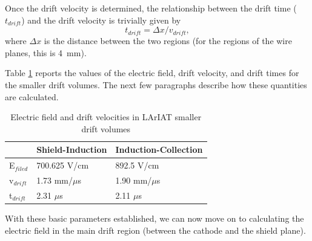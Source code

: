 Once the drift velocity is determined, the relationship between the drift time ($t_{drift}$) and the drift velocity is trivially given by
\begin{equation}
t_{drift} = \Delta x/v_{drift}, \label{eq:drifttime}
\end{equation}
where $\Delta x$ is the distance between the two regions (for the regions of the wire planes, this is 4~mm).

Table \ref{tab:Efields} reports the values of the electric field, drift velocity, and drift times for the smaller drift volumes. The next few paragraphs describe how these quantities are calculated.

 
\begin{table}[]
\centering
\caption{Electric field and drift velocities in LArIAT smaller drift volumes}
\label{tab:Efields}
\begin{tabular}{|l|l|l|}
\hline
& Shield-Induction & Induction-Collection \\ \hline
E$_{filed}$ &                 700.625 V/cm        &                892.5  V/cm             \\ \hline
v$_{drift}$ &                   1.73  mm/$\mu$s   &                  1.90 mm/$\mu$s        \\ \hline
t$_{drift}$ &                   2.31  $\mu$s      &                   2.11 $\mu$s          \\ \hline

\end{tabular}
\end{table}

With these basic parameters established, we can now move on to calculating the electric field in the main drift region (between the cathode and the shield plane).
